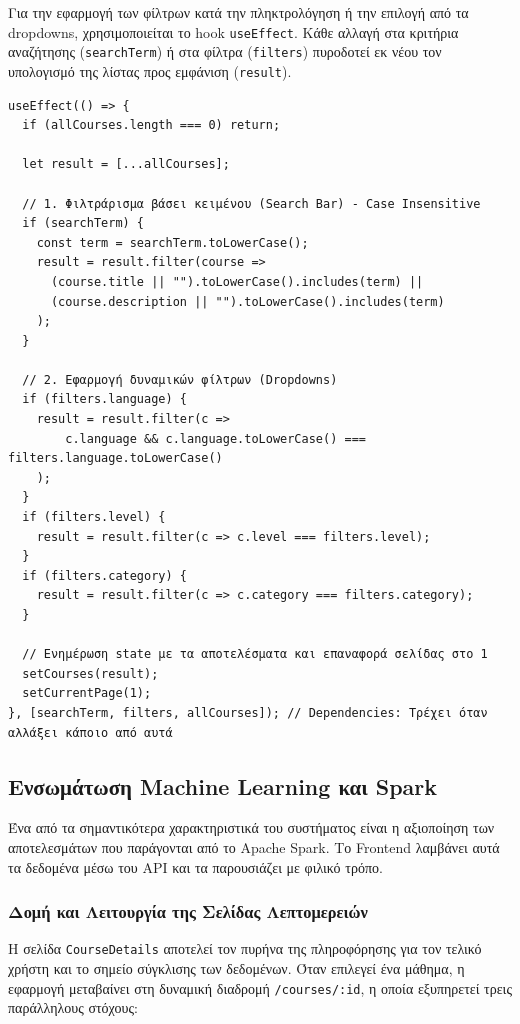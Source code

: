 \documentclass[a4paper,12pt]{article}
\begin{document}
Για την εφαρμογή των φίλτρων κατά την πληκτρολόγηση ή την επιλογή από τα dropdowns, χρησιμοποιείται το hook \texttt{useEffect}. Κάθε αλλαγή στα κριτήρια αναζήτησης (\texttt{searchTerm}) ή στα φίλτρα (\texttt{filters}) πυροδοτεί εκ νέου τον υπολογισμό της λίστας προς εμφάνιση (\texttt{result}).

\begin{verbatim}
useEffect(() => {
  if (allCourses.length === 0) return;

  let result = [...allCourses];

  // 1. Φιλτράρισμα βάσει κειμένου (Search Bar) - Case Insensitive
  if (searchTerm) {
    const term = searchTerm.toLowerCase();
    result = result.filter(course => 
      (course.title || "").toLowerCase().includes(term) ||
      (course.description || "").toLowerCase().includes(term)
    );
  }

  // 2. Εφαρμογή δυναμικών φίλτρων (Dropdowns)
  if (filters.language) {
    result = result.filter(c => 
        c.language && c.language.toLowerCase() === filters.language.toLowerCase()
    );
  }
  if (filters.level) {
    result = result.filter(c => c.level === filters.level);
  }
  if (filters.category) {
    result = result.filter(c => c.category === filters.category);
  }

  // Ενημέρωση state με τα αποτελέσματα και επαναφορά σελίδας στο 1
  setCourses(result);
  setCurrentPage(1);
}, [searchTerm, filters, allCourses]); // Dependencies: Τρέχει όταν αλλάξει κάποιο από αυτά
\end{verbatim}

\subsection{Ενσωμάτωση Machine Learning και Spark}

Ένα από τα σημαντικότερα χαρακτηριστικά του συστήματος είναι η αξιοποίηση των αποτελεσμάτων που παράγονται από το Apache Spark. Το Frontend λαμβάνει αυτά τα δεδομένα μέσω του API και τα παρουσιάζει με φιλικό τρόπο.

\subsubsection{Δομή και Λειτουργία της Σελίδας Λεπτομερειών}
Η σελίδα \texttt{CourseDetails} αποτελεί τον πυρήνα της πληροφόρησης για τον τελικό χρήστη και το σημείο σύγκλισης των δεδομένων. Όταν επιλεγεί ένα μάθημα, η εφαρμογή μεταβαίνει στη δυναμική διαδρομή \texttt{/courses/:id}, η οποία εξυπηρετεί τρεις παράλληλους στόχους:
\end{document}
